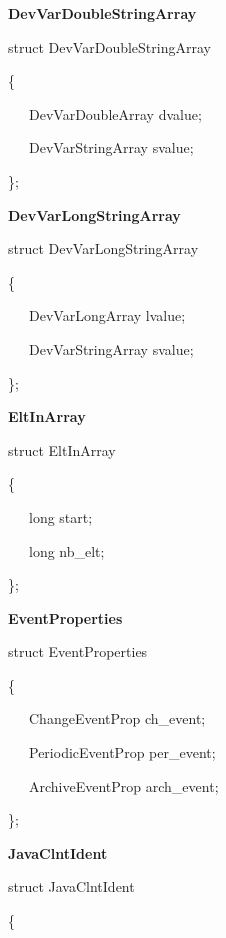 \begin{flushleft}
\textbf{DevVarDoubleStringArray}
\par\end{flushleft}

struct DevVarDoubleStringArray

\{

~~~DevVarDoubleArray dvalue;

~~~DevVarStringArray svalue;

\};\\


\begin{flushleft}
\textbf{DevVarLongStringArray}
\par\end{flushleft}

struct DevVarLongStringArray

\{

~~~DevVarLongArray lvalue;

~~~DevVarStringArray svalue;

\};\\


\begin{flushleft}
\textbf{EltInArray}
\par\end{flushleft}

struct EltInArray

\{

~~~long start;

~~~long nb\_elt;

\};\\


\begin{flushleft}
\textbf{EventProperties}
\par\end{flushleft}

struct EventProperties

\{

~~~ChangeEventProp ch\_event;

~~~PeriodicEventProp per\_event;

~~~ArchiveEventProp arch\_event;

\};\\


\begin{flushleft}
\textbf{JavaClntIdent}
\par\end{flushleft}

struct JavaClntIdent

\{

